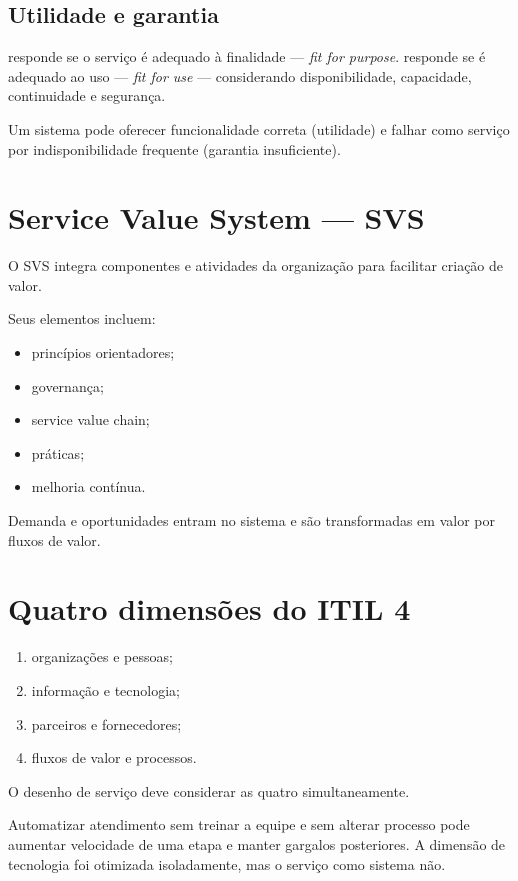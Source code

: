 \subsection{Utilidade e garantia}

 responde se o serviço é adequado à finalidade — \emph{fit for purpose}.  responde se é adequado ao uso — \emph{fit for use} — considerando disponibilidade, capacidade, continuidade e segurança.

Um sistema pode oferecer funcionalidade correta (utilidade) e falhar como serviço por indisponibilidade frequente (garantia insuficiente).

\section{Service Value System — SVS}

O SVS integra componentes e atividades da organização para facilitar criação de valor.

Seus elementos incluem:
\begin{itemize}
\item princípios orientadores;
\item governança;
\item service value chain;
\item práticas;
\item melhoria contínua.
\end{itemize}

Demanda e oportunidades entram no sistema e são transformadas em valor por fluxos de valor.

\section{Quatro dimensões do ITIL 4}

\begin{enumerate}
\item organizações e pessoas;
\item informação e tecnologia;
\item parceiros e fornecedores;
\item fluxos de valor e processos.
\end{enumerate}

O desenho de serviço deve considerar as quatro simultaneamente.

\begin{exemplo}
Automatizar atendimento sem treinar a equipe e sem alterar processo pode aumentar velocidade de uma etapa e manter gargalos posteriores. A dimensão de tecnologia foi otimizada isoladamente, mas o serviço como sistema não.
\end{exemplo}

